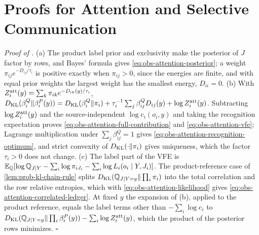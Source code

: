 \section{Proofs for Attention and Selective Communication}
\label{sec:proofs-attention}

\noindent\emph{Proof of .}
(a) The product label prior and exclusivity make the posterior of \(J\) factor
by rows, and Bayes' formula gives \eqref{eq:obs-attention-posterior}; a weight
\(\pi_{ij}e^{-D_{ij}/\tau_i}\) is positive exactly when \(\pi_{ij}>0\), since
the energies are finite, and with equal prior weights the largest weight has
the smallest energy, \(D_{ii}=0\). (b) With
\(Z_i^{\rm att}(y)=\sum_k\pi_{ik}e^{-D_{ik}(y)/\tau_i}\),
\(D_{\mathrm{KL}}(\beta^Q_i\Vert\beta^P_i(y))=D_{\mathrm{KL}}(\beta^Q_i\Vert\pi_i)
+\tau_i^{-1}\sum_j\beta^Q_{ij}D_{ij}(y)+\log Z_i^{\rm att}(y)\). Subtracting
\(\log Z_i^{\rm att}(y)\) and the source-independent \(\log\mathrm c_i(o_i,y)\)
and taking the recognition expectation proves
\eqref{eq:obs-attention-full-contribution} and \eqref{eq:obs-attention-vfe};
Lagrange multiplication under \(\sum_j\beta^Q_{ij}=1\) gives
\eqref{eq:obs-attention-recognition-optimum}, and strict convexity of
\(D_{\mathrm{KL}}(\cdot\Vert\pi_i)\) gives uniqueness, which the factor \(\tau_i>0\) does
not change. (c) The label part of the VFE is
\(\mathbb E_{\mathbb Q}[\log\mathbb Q_{J\mid Y}-\sum_i\log\pi_{iJ_i}
-\sum_i\log L_i(o_i\mid Y,J_i)]\). The product-reference case of
\cref{lem:prob-kl-chain-rule} splits
\(D_{\mathrm{KL}}(\mathbb Q_{J\mid Y=y}\Vert\prod_i\pi_i)\) into the total correlation and
the row relative entropies, which with \eqref{eq:obs-attention-likelihood}
gives \eqref{eq:obs-attention-correlated-ledger}. At fixed \(y\) the expansion
of (b), applied to the product reference, equals the label terms other than
\(-\sum_i\log\mathrm c_i\) to
\(D_{\mathrm{KL}}(\mathbb Q_{J\mid Y=y}\Vert\prod_i\beta^P_i(y))-\sum_i\log Z_i^{\rm att}(y)\),
which the product of the posterior rows minimizes. \(\square\)

